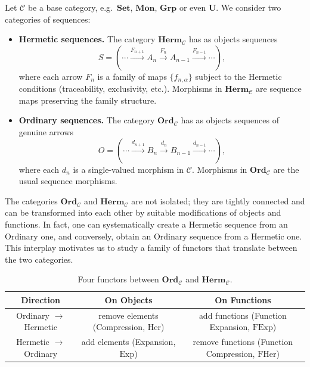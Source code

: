 \documentclass[11pt]{book}
\theoremstyle{definition}
\theoremstyle{plain}
\theoremstyle{remark}
\begin{document}
Let $\mathcal{C}$ be a base category, e.g.\ $\mathbf{Set}$, $\mathbf{Mon}$, $\mathbf{Grp}$ or even $\mathbf{U}$.  
We consider two categories of sequences:

\begin{itemize}
    \item \textbf{Hermetic sequences.}  
    The category $\mathbf{Herm}_\mathcal{C}$ has as objects sequences
    \[
    S = (\cdots \xrightarrow{F_{n+1}} A_n \xrightarrow{F_n} A_{n-1} \xrightarrow{F_{n-1}} \cdots),
    \]
    where each arrow $F_n$ is a family of maps $\{f_{n,\alpha}\}$ subject to the Hermetic conditions (traceability, exclusivity, etc.).  
    Morphisms in $\mathbf{Herm}_\mathcal{C}$ are sequence maps preserving the family structure.

    \item \textbf{Ordinary sequences.}  
    The category $\mathbf{Ord}_\mathcal{C}$ has as objects sequences of genuine arrows
    \[
    O = (\cdots \xrightarrow{d_{n+1}} B_n \xrightarrow{d_n} B_{n-1} \xrightarrow{d_{n-1}} \cdots),
    \]
    where each $d_n$ is a single-valued morphism in $\mathcal{C}$.  
    Morphisms in $\mathbf{Ord}_\mathcal{C}$ are the usual sequence morphisms.
\end{itemize}

The categories $\mathbf{Ord}_\mathcal C$ and $\mathbf{Herm}_\mathcal C$ are not isolated; 
they are tightly connected and can be transformed into each other by 
suitable modifications of objects and functions. 
In fact, one can systematically create a Hermetic sequence from an Ordinary one, 
and conversely, obtain an Ordinary sequence from a Hermetic one.  
This interplay motivates us to study a family of functors 
that translate between the two categories.  

\begin{table}[h]
\centering
\renewcommand{\arraystretch}{1.3}
\begin{tabular}{|c|c|c|}
\hline
Direction & On Objects & On Functions \\
\hline
Ordinary $\to$ Hermetic & remove elements (Compression, $\mathrm{Her}$) 
& add functions (Function Expansion, $\mathrm{FExp}$) \\
\hline
Hermetic $\to$ Ordinary & add elements (Expansion, $\mathrm{Exp}$) 
& remove functions (Function Compression, $\mathrm{FHer}$) \\
\hline
\end{tabular}
\caption{Four functors between $\mathbf{Ord}_\mathcal C$ and $\mathbf{Herm}_\mathcal C$.}
\end{table}
\end{document}
